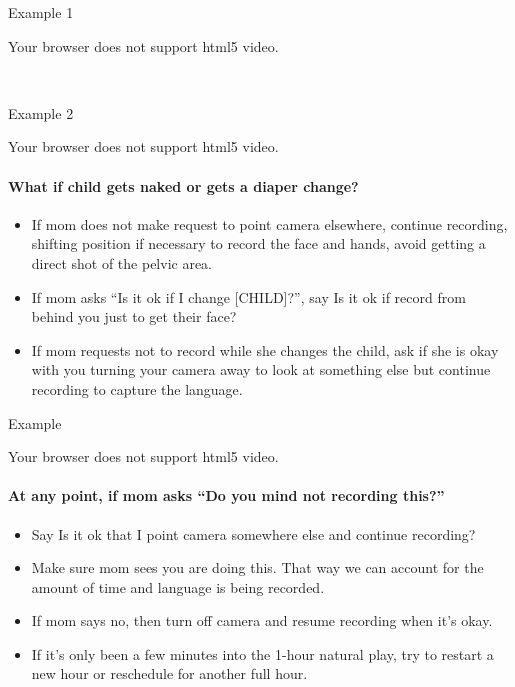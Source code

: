 \documentclass[
]{book}
\providecommand{\tightlist}{%
  \setlength{\itemsep}{0pt}\setlength{\parskip}{0pt}}
\begin{document}
Example 1

Your browser does not support html5 video.

 

Example 2

Your browser does not support html5 video.

\hypertarget{what-if-child-gets-naked-or-gets-a-diaper-change}{%
\paragraph*{What if child gets naked or gets a diaper change?}\label{what-if-child-gets-naked-or-gets-a-diaper-change}}

\begin{itemize}
\tightlist
\item
  If mom does not make request to point camera elsewhere, continue recording, shifting position if necessary to record the face and hands, avoid getting a direct shot of the pelvic area.
\item
  If mom asks ``Is it ok if I change {[}CHILD{]}?'', say Is it ok if record from behind you just to get their face?
\item
  If mom requests not to record while she changes the child, ask if she is okay with you turning your camera away to look at something else but continue recording to capture the language.
\end{itemize}

Example

Your browser does not support html5 video.

\hypertarget{at-any-point-if-mom-asks-do-you-mind-not-recording-this}{%
\paragraph*{At any point, if mom asks ``Do you mind not recording this?''}\label{at-any-point-if-mom-asks-do-you-mind-not-recording-this}}

\begin{itemize}
\tightlist
\item
  Say Is it ok that I point camera somewhere else and continue recording?\\
\item
  Make sure mom sees you are doing this. That way we can account for the amount of time and language is being recorded.
\item
  If mom says no, then turn off camera and resume recording when it's okay.
\item
  If it's only been a few minutes into the 1-hour natural play, try to restart a new hour or reschedule for another full hour.
\end{itemize}
\end{document}
